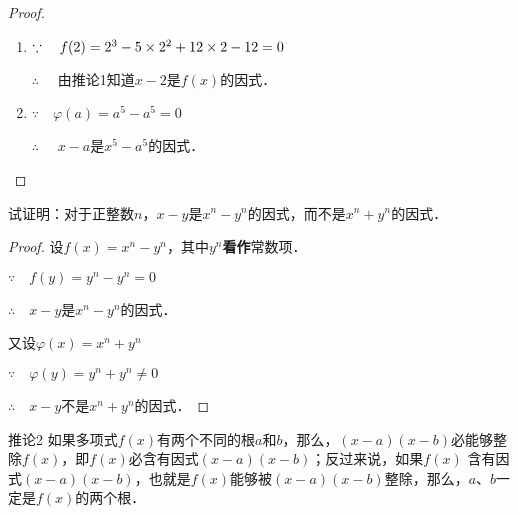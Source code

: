 \begin{proof}
\begin{enumerate}
    \item $\because\quad f(2)=2^3-5\times 2^2+12\times2-12=0$
    
    $\therefore\quad $ 由推论1知道$x-2$是$f(x)$的因式．
    \item $\because\quad \varphi(a)=a^5-a^5=0$
    
    $\therefore\quad $ $x-a$是$x^5-a^5$的因式．
\end{enumerate}

\end{proof}

\begin{example}
试证明：对于正整数$n$，$x-y$是$x^n-y^n$的因式，而不是$x^n+y^n$的因式．
\end{example}

\begin{proof}
设$f(x)=x^n-y^n$，其中$y^n$\textbf{看作}常数项．

$\because\quad f (y) =y^n -y^n=0$

$\therefore\quad x-y$是$x^n-y^n$的因式．

又设$\varphi(x)=x^n+y^n$

$\because\quad \varphi(y) =y^n +y^n\ne 0$

$\therefore\quad x-y$不是$x^n+y^n$的因式．
\end{proof}

\begin{blk}{推论2}
如果多项式$f(x)$有两个不同的根$a$和$b$，那么，$(x-a)(x-b)$必能够整除$f(x)$，即$f(x)$必含有因式$(x-a)(x-b)$；反过来说，如果$f(x)$ 含有因式$(x-a)(x-b)$，也就是$f(x)$能够被$(x-a)(x-b)$整除，那么，$a$、$b$一定是$f(x)$的两个根．
\end{blk}

